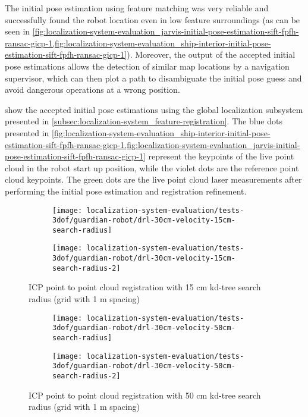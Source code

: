 The initial pose estimation using feature matching was very reliable and successfully found the robot location even in low feature surroundings (as can be seen in \cref{fig:localization-system-evaluation_jarvis-initial-pose-estimation-sift-fpfh-ransac-gicp-1,fig:localization-system-evaluation_ship-interior-initial-pose-estimation-sift-fpfh-ransac-gicp-1}). Moreover, the output of the accepted initial pose estimations allows the detection of similar map locations by a navigation supervisor, which can then plot a path to disambiguate the initial pose guess and avoid dangerous operations at a wrong position.

 show the accepted initial pose estimations using the global localization subsystem presented in \cref{subsec:localization-system_feature-registration}. The blue dots presented in \cref{fig:localization-system-evaluation_ship-interior-initial-pose-estimation-sift-fpfh-ransac-gicp-1,fig:localization-system-evaluation_jarvis-initial-pose-estimation-sift-fpfh-ransac-gicp-1} represent the keypoints of the live point cloud in the robot start up position, while the violet dots are the reference point cloud keypoints. The green dots are the live point cloud laser measurements after performing the initial pose estimation and registration refinement.

\begin{figure}[H]
	\centering
	\begin{subfigure}[ht]{0.425\textwidth}
		\centering
		\texttt{[image: localization-system-evaluation/tests-3dof/guardian-robot/drl-30cm-velocity-15cm-search-radius]}
	\end{subfigure}
	\begin{subfigure}[ht]{0.425\textwidth}
		\centering
		\texttt{[image: localization-system-evaluation/tests-3dof/guardian-robot/drl-30cm-velocity-15cm-search-radius-2]}
	\end{subfigure}
	\caption{ICP point to point cloud registration with 15 cm kd-tree search radius (grid with 1 m spacing)}
	\label{fig:localization-system-evaluation_guardian-drl-30cm-velocity-15cm-search-radius}
\end{figure}

\begin{figure}[H]
	\centering
	\begin{subfigure}[ht]{0.425\textwidth}
		\centering
		\texttt{[image: localization-system-evaluation/tests-3dof/guardian-robot/drl-30cm-velocity-50cm-search-radius]}
	\end{subfigure}
	\begin{subfigure}[ht]{0.425\textwidth}
		\centering
		\texttt{[image: localization-system-evaluation/tests-3dof/guardian-robot/drl-30cm-velocity-50cm-search-radius-2]}
	\end{subfigure}
	\caption{ICP point to point cloud registration with 50 cm kd-tree search radius (grid with 1 m spacing)}
	\label{fig:localization-system-evaluation_guardian-drl-30cm-velocity-50cm-search-radius}
\end{figure}


